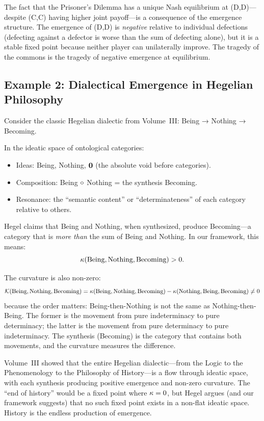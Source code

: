 \begin{remark}
The fact that the Prisoner's Dilemma has a unique Nash equilibrium at (D,D)---despite
(C,C) having higher joint payoff---is a consequence of the emergence structure.
The emergence of (D,D) is \emph{negative} relative to individual defections
(defecting against a defector is worse than the sum of defecting alone), but
it is a stable fixed point because neither player can unilaterally improve.
The tragedy of the commons is the tragedy of negative emergence at equilibrium.
\end{remark}

\subsection{Example 2: Dialectical Emergence in Hegelian Philosophy}

Consider the classic Hegelian dialectic from Volume~III: Being → Nothing →
Becoming.

In the ideatic space of ontological categories:
\begin{itemize}
  \item Ideas: Being, Nothing, $\mathbf{0}$ (the absolute void before categories).
  \item Composition: Being $\circ$ Nothing = the synthesis Becoming.
  \item Resonance: the ``semantic content'' or ``determinateness'' of each
    category relative to others.
\end{itemize}

Hegel claims that Being and Nothing, when synthesized, produce Becoming---a
category that is \emph{more than} the sum of Being and Nothing. In our
framework, this means:
\[
  \kappa(\text{Being}, \text{Nothing}, \text{Becoming}) > 0.
\]

The curvature is also non-zero:
\[
  \mathcal{K}(\text{Being}, \text{Nothing}, \text{Becoming})
  = \kappa(\text{Being}, \text{Nothing}, \text{Becoming})
    - \kappa(\text{Nothing}, \text{Being}, \text{Becoming}) \neq 0
\]
because the order matters: Being-then-Nothing is not the same as Nothing-then-Being.
The former is the movement from pure indeterminacy to pure determinacy; the
latter is the movement from pure determinacy to pure indeterminacy. The
synthesis (Becoming) is the category that contains both movements, and the
curvature measures the difference.

Volume~III showed that the entire Hegelian dialectic---from the Logic to the
Phenomenology to the Philosophy of History---is a flow through ideatic space,
with each synthesis producing positive emergence and non-zero curvature. The
``end of history'' would be a fixed point where $\kappa = 0$, but Hegel
argues (and our framework suggests) that no such fixed point exists in a
non-flat ideatic space. History is the endless production of emergence.

